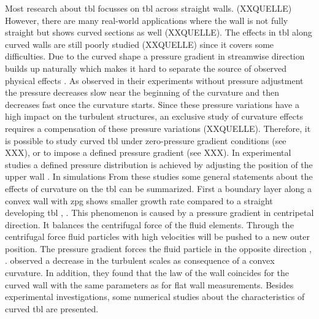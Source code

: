 Most research about \acrshort{tbl} focusses on \acrshort{tbl} across straight walls. (XXQUELLE) 
However, there are many real-world applications where the wall is not fully straight but shows curved sections as well (XXQUELLE). 
The effects in \acrshort{tbl} along curved walls are still poorly studied (XXQUELLE) since it covers some difficulties. 
Due to the curved shape a pressure gradient in streamwise direction builds up naturally which makes it hard to separate the source of observed physical effects \citep{so_experimental_nodate}. 
As \citet{so_experiment_1973} observed in their experiments without pressure adjustment the pressure decreases slow near the beginning of the curvature and then decreases fast once the curvature starts. 
Since these pressure variations have a high impact on the turbulent structures, an exclusive study of curvature effects requires a compensation of these pressure variations (XXQUELLE). 
Therefore, it is possible to study curved \acrshort{tbl} under zero-pressure gradient conditions (see XXX), or to impose a defined pressure gradient (see XXX). 
In experimental studies a defined pressure distribution is achieved by adjusting the position of the upper wall \citep{so_experimental_nodate, johnston_experimental_nodate, gillis_turbulent_1983,schwarz_convex_1996}. 
In simulations 
From these studies some general statements about the effects of curvature on the \acrshort{tbl} can be summarized.
First a boundary layer along a convex wall with \acrshort{zpg} shows smaller growth rate compared to a straight developing \acrfull{tbl} \citep{so_experimental_nodate}, \citep{meroney_turbulent_1975}. 
This phenomenon is caused by a pressure gradient in centripetal direction. 
It balances the centrifugal force of the fluid elements. Through the centrifugal force fluid particles with high velocities will be pushed to a new outer position. 
The pressure gradient forces the fluid particle in the opposite direction \citep{so_experimental_nodate}, \citep{meroney_turbulent_1975}.
\citet{gillis_turbulent_1983} observed a decrease in the turbulent scales as consequence of a convex curvature. 
In addition, they found that the law of the wall coincides for the curved wall with the same parameters as for flat wall measurements. 
Besides experimental investigations, some numerical studies about the characteristics of curved \acrshort{tbl} are presented.

